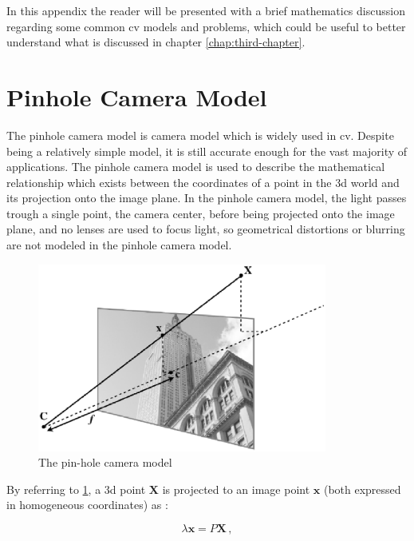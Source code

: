 In this appendix the reader will be presented with a brief mathematics discussion regarding some common \acrshort{cv} models and problems, which could be useful to better understand what is discussed in chapter \ref{chap:third-chapter}.

\section{Pinhole Camera Model}\label{subsection:pinhole}
The pinhole camera model is camera model which is widely used in \acrfull{cv}. Despite being a relatively simple model, it is still accurate enough for the vast majority of applications. The pinhole camera model is used to describe the mathematical relationship which exists between the coordinates of a point in the \acrshort{3d} world and its projection onto the image plane. In the pinhole camera model, the light passes trough a single point, the camera center, before being projected onto the image plane, and no lenses are used to focus light, so geometrical distortions or blurring are not modeled in the pinhole camera model.

\begin{figure}[htbp]
  \centering
  \includegraphics[width=0.85\textwidth]{gfx/pinholeCamera.eps}
  \caption{The pin-hole camera model \cite{solem2012programming}}
  \label{fig:pinholeCamera}
\end{figure}

By referring to \ref{fig:pinholeCamera}, a \acrshort{3d} point $\mathbf{X}$ is projected to an image point $\mathbf{x}$ (both expressed in homogeneous coordinates) as :

\begin{equation*}
  \lambda\mathbf{x}=P\mathbf{X} \,,
\end{equation*}


